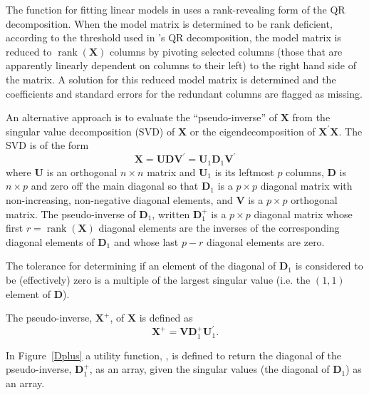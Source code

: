 \documentclass[shortnames,article]{jss}
\newcommand{\rank}{\operatorname{rank}}
\begin{document}
The  function for fitting linear models in  uses
a rank-revealing form of the QR decomposition.  When the model matrix
is determined to be rank deficient, according to the threshold used in
's QR decomposition, the model matrix is reduced to
$\rank{(\bm X)}$ columns by pivoting selected columns (those that are
apparently linearly dependent on columns to their left) to the right
hand side of the matrix.  A solution for this reduced model matrix is
determined and the coefficients and standard errors for the redundant
columns are flagged as missing.

An alternative approach is to evaluate the ``pseudo-inverse'' of $\bm
X$ from the singular value decomposition (SVD) of $\bm X$ or the
eigendecomposition of $\bm X^\prime\bm X$.  The SVD is of the form
\begin{displaymath}
  \bm X=\bm U\bm D\bm V^\prime=\bm U_1\bm D_1\bm V^\prime
\end{displaymath}
where $\bm U$ is an orthogonal $n\times n$ matrix and $\bm U_1$ is its
leftmost $p$ columns, $\bm D$ is $n\times p$ and zero off the main
diagonal so that $\bm D_1$ is a $p\times p$ diagonal matrix with
non-increasing, non-negative diagonal elements, and $\bm V$ is a $p\times
p$ orthogonal matrix.  The pseudo-inverse of $\bm D_1$, written $\bm
D_1^+$ is a $p\times p$ diagonal matrix whose first $r=\rank(\bm X)$
diagonal elements are the inverses of the corresponding diagonal
elements of $\bm D_1$ and whose last $p-r$ diagonal elements are zero.

The tolerance for determining if an element of the diagonal of $\bm D_1$
is considered to be (effectively) zero is a multiple of the largest
singular value (i.e. the $(1,1)$ element of $\bm D$).

The pseudo-inverse, $\bm X^+$, of $\bm X$ is defined as
\begin{displaymath}
  \bm X^+=\bm V\bm D_1^+\bm U_1^\prime .
\end{displaymath}

In Figure~\ref{Dplus} a utility function, , is defined to
return the diagonal of the pseudo-inverse, $\bm D_1^+$, as an array,
given the singular values (the diagonal of $\bm D_1$) as an array.
\end{document}
